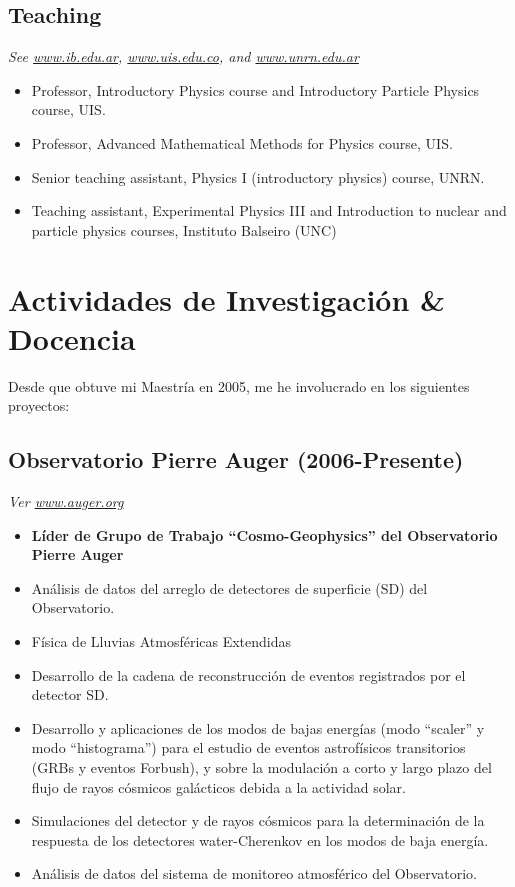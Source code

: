 \subsection*{Teaching}
{\small{\textit{See \href{http://www.ib.edu.ar}{www.ib.edu.ar}, \href{http://www.uis.edu.co}{www.uis.edu.co}, and \href{http://www.unrn.edu.ar}{www.unrn.edu.ar}}}}
\begin{itemize}
\item Professor, Introductory Physics course and Introductory Particle Physics course, UIS.
\item Professor, Advanced Mathematical Methods for Physics course, UIS.
\item Senior teaching assistant, Physics I (introductory physics) course, UNRN.
\item Teaching assistant, Experimental Physics III and Introduction to nuclear
and particle physics courses, Instituto Balseiro (UNC)
\end{itemize}
\else
\section*{Actividades de Investigación \& Docencia}

Desde que obtuve mi Maestría en 2005, me he involucrado en los siguientes proyectos:

\subsection*{Observatorio Pierre Auger (2006-Presente)}

{\small{\textit{Ver \href{http://www.auger.org/}{www.auger.org}}}}
\begin{itemize}
\item {\bf{Líder de Grupo de Trabajo ``Cosmo-Geophysics'' del Observatorio Pierre Auger}}
\item Análisis de datos del arreglo de detectores de superficie (SD) del Observatorio.
\item Física de Lluvias Atmosféricas Extendidas
\item Desarrollo de la cadena de reconstrucción de eventos registrados por el detector SD.
\item Desarrollo y aplicaciones de los modos de bajas energías (modo ``scaler'' y modo ``histograma'') para el estudio de eventos astrofísicos transitorios (GRBs y eventos Forbush), y sobre la modulación a corto y largo plazo del flujo de rayos cósmicos galácticos debida a la actividad solar.
\item Simulaciones del detector y de rayos cósmicos para la determinación de la respuesta de los detectores water-Cherenkov en los modos de baja energía.
\item Análisis de datos del sistema de monitoreo atmosférico del Observatorio.
\end{itemize}

